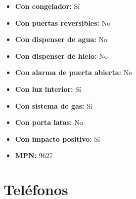 \documentclass{article}
\begin{document}
\begin{adjustwidth}{2em}{}
\begin{itemize}
\begin{itemize}
    \item \textbf {Con congelador:} Sí
    \item \textbf {Con puertas reversibles:} No
    \item \textbf {Con dispenser de agua:} No
    \item \textbf {Con dispenser de hielo:} No
    \item \textbf {Con alarma de puerta abierta:} No
    \item \textbf {Con luz interior:} Sí
    \item \textbf {Con sistema de gas:} Sí
    \item \textbf {Con porta latas:} No
    \item \textbf {Con impacto positivo:} Sí
    \item \textbf {MPN:} 9627
        \end{itemize}
    \end{itemize}

    \vspace{1\baselineskip} %
    \end{adjustwidth}

    
    \section*{Teléfonos}
    \setcounter{subsection}{0} %
    
\end{document}
